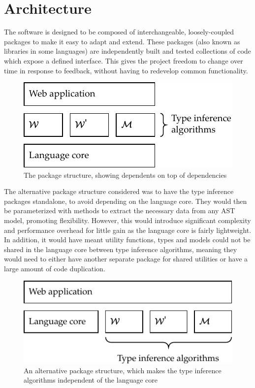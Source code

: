 \documentclass[a4paper,fleqn,oneside,12pt]{report}
\begin{document}
\section{Architecture}\label{id:h.l33hnjbawceh}

The software is designed to be composed of interchangeable, loosely-coupled packages to make it easy to adapt and extend. These packages (also known as libraries in some languages) are independently built and tested collections of code which expose a defined interface. This gives the project freedom to change over time in response to feedback, without having to redevelop common functionality.

{\centering \begin{figure}[h!]
  \centering
  \includegraphics[width=0.6\linewidth]{images/module_structure.pdf}
  \caption{The package structure, showing dependents on top of dependencies}
\end{figure} \par}

The alternative package structure considered was to have the type inference packages standalone, to avoid depending on the language core. They would then be parameterized with methods to extract the necessary data from any AST model, promoting flexibility. However, this would introduce significant complexity and performance overhead for little gain as the language core is fairly lightweight. In addition, it would have meant utility functions, types and models could not be shared in the language core between type inference algorithms, meaning they would need to either have another separate package for shared utilities or have a large amount of code duplication.

{\centering \begin{figure}[h!]
  \centering
  \includegraphics[width=0.65\linewidth]{images/module_structure_alt.pdf}
  \caption{An alternative package structure, which makes the type inference algorithms independent of the language core}
\end{figure} \par}
\end{document}
